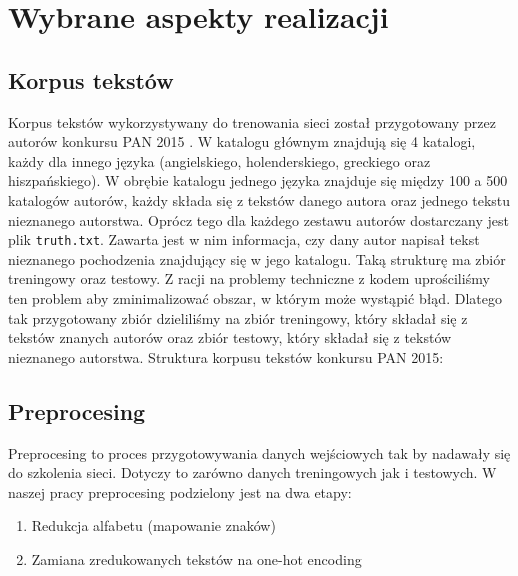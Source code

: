 \newpage
\section{Wybrane aspekty realizacji}

\subsection{Korpus tekstów}
Korpus tekstów wykorzystywany do trenowania sieci został przygotowany przez autorów konkursu PAN 2015 \cite{pan}.
W katalogu głównym znajdują się 4 katalogi, każdy dla innego języka (angielskiego, holenderskiego, greckiego oraz hiszpańskiego).
W obrębie katalogu jednego języka znajduje się między 100 a 500 katalogów autorów, każdy składa się z tekstów danego autora oraz jednego
tekstu nieznanego autorstwa. Oprócz tego dla każdego zestawu autorów dostarczany jest plik \texttt{truth.txt}.
Zawarta jest w nim informacja, czy dany autor napisał tekst nieznanego pochodzenia znajdujący się w jego katalogu.
Taką strukturę ma zbiór treningowy oraz testowy. Z racji na problemy techniczne z kodem uprościliśmy ten problem 
aby zminimalizować obszar, w którym może wystąpić błąd. Dlatego tak przygotowany zbiór dzieliliśmy na zbiór treningowy, który
składał się z tekstów znanych autorów oraz zbiór testowy, który składał się z tekstów nieznanego autorstwa. 
\newline Struktura korpusu tekstów konkursu PAN 2015:

\myspace
{}
\myspace

\subsection{Preprocesing}
Preprocesing to proces przygotowywania danych wejściowych tak by nadawały się do szkolenia sieci.
Dotyczy to zarówno danych treningowych jak i testowych.
W naszej pracy preprocesing podzielony jest na dwa etapy:
\begin{enumerate}
	\item Redukcja alfabetu (mapowanie znaków)
	\item Zamiana zredukowanych tekstów na one-hot encoding
\end{enumerate}

